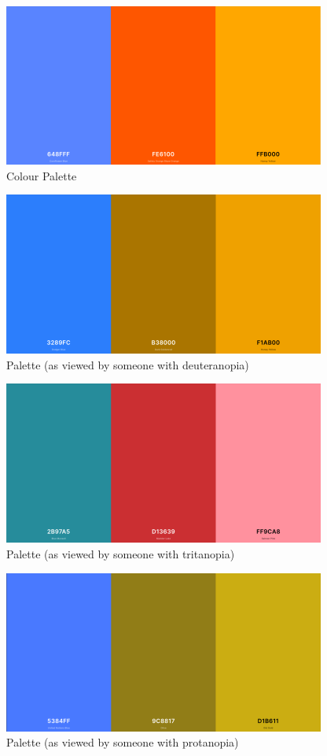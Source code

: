 \documentclass[a4paper,11pt]{article}
\begin{document}
\begin{figure}[H]
\centering
\includegraphics[scale=0.45]{img/Palette_Standard.png}
\caption{Colour Palette}
\label{fig:palette_standard}
\end{figure}
\begin{figure}[H]
\centering
\includegraphics[scale=0.45]{img/Palette_Deuteranopia.png}
\caption{Palette (as viewed by someone with deuteranopia)}
\label{fig:palette_deuteranopia}
\end{figure}
\begin{figure}[H]
\centering
\includegraphics[scale=0.45]{img/Palette_Tritanopia.png}
\caption{Palette (as viewed by someone with tritanopia)}
\label{fig:palette_tritanopia}
\end{figure}
\begin{figure}[H]
\centering
\includegraphics[scale=0.45]{img/Palette_Protanopia.png}
\caption{Palette (as viewed by someone with protanopia)}
\label{fig:palette_protanopia}
\end{figure}
\end{document}
